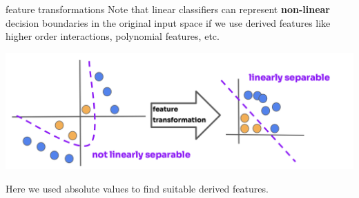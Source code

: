 \documentclass[11pt,compress,t,notes=noshow, xcolor=table]{beamer}
\begin{document}
\begin{vbframe}{feature transformations}
Note that linear classifiers can represent \textbf{non-linear} decision boundaries in the original input space if we use derived features like higher order interactions, polynomial features, etc.

\begin{center}
\includegraphics{figure_man/linear_separability-1.png} 
\end{center}

\lz

Here we used absolute values to find suitable derived features.

\end{vbframe}

\endlecture
\end{document}
